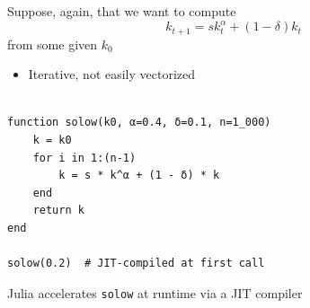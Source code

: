 \begin{frame}
    
    \Eg Suppose, again, that we want to compute 
    \begin{equation*}
        k_{t+1} = s k_t^\alpha + (1 - \delta) k_t
    \end{equation*}
    from some given $k_0$ 


    \vspace{0.5em}
    \vspace{0.5em}
    \vspace{0.5em}
    \vspace{0.5em}
    \begin{itemize}
        \item Iterative, not easily vectorized
    \end{itemize}

\end{frame}


\begin{frame}[fragile]
    
    \begin{verbatim}

function solow(k0, α=0.4, δ=0.1, n=1_000)
    k = k0
    for i in 1:(n-1)
        k = s * k^α + (1 - δ) * k
    end
    return k
end

solow(0.2)  # JIT-compiled at first call
    \end{verbatim}

    \vspace{0.5em}
    \vspace{0.5em}
    \vspace{0.5em}
    \vspace{0.5em}

    Julia accelerates \texttt{solow} at runtime via a JIT compiler

\end{frame}


